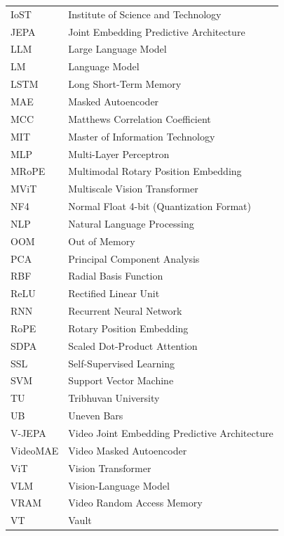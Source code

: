 \begin{longtable}{@{}p{3.5cm}p{10.5cm}@{}}
IoST & Institute of Science and Technology \\
JEPA & Joint Embedding Predictive Architecture \\
LLM & Large Language Model \\
LM & Language Model \\
LSTM & Long Short-Term Memory \\
MAE & Masked Autoencoder \\
MCC & Matthews Correlation Coefficient \\
MIT & Master of Information Technology \\
MLP & Multi-Layer Perceptron \\
MRoPE & Multimodal Rotary Position Embedding \\
MViT & Multiscale Vision Transformer \\
NF4 & Normal Float 4-bit (Quantization Format) \\
NLP & Natural Language Processing \\
OOM & Out of Memory \\
PCA & Principal Component Analysis \\
RBF & Radial Basis Function \\
ReLU & Rectified Linear Unit \\
RNN & Recurrent Neural Network \\
RoPE & Rotary Position Embedding \\
SDPA & Scaled Dot-Product Attention \\
SSL & Self-Supervised Learning \\
SVM & Support Vector Machine \\
TU & Tribhuvan University \\
UB & Uneven Bars \\
V-JEPA & Video Joint Embedding Predictive Architecture \\
VideoMAE & Video Masked Autoencoder \\
ViT & Vision Transformer \\
VLM & Vision-Language Model \\
VRAM & Video Random Access Memory \\
VT & Vault \\
\bottomrule
\end{longtable}

